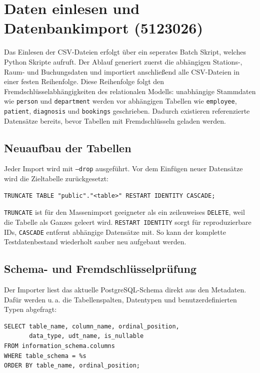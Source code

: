 \section{Daten einlesen und Datenbankimport (5123026)}

Das Einlesen der CSV-Dateien erfolgt über ein seperates Batch Skript, welches Python Skripte aufruft. Der Ablauf generiert zuerst die
abhängigen Stations-, Raum- und Buchungsdaten und importiert anschließend alle CSV-Dateien in einer
festen Reihenfolge. Diese Reihenfolge folgt den Fremdschlüsselabhängigkeiten des relationalen
Modells: unabhängige Stammdaten wie \texttt{person} und \texttt{department} werden vor abhängigen
Tabellen wie \texttt{employee}, \texttt{patient}, \texttt{diagnosis} und \texttt{bookings}
geschrieben. Dadurch existieren referenzierte Datensätze bereits, bevor Tabellen mit
Fremdschlüsseln geladen werden.

\subsection{Neuaufbau der Tabellen}

Jeder Import wird mit \texttt{--drop} ausgeführt. Vor dem Einfügen neuer Datensätze wird die
Zieltabelle zurückgesetzt:

\begin{lstlisting}[style=sqlstyle]
TRUNCATE TABLE "public"."<table>" RESTART IDENTITY CASCADE;
\end{lstlisting}

\texttt{TRUNCATE} ist für den Massenimport geeigneter als ein zeilenweises \texttt{DELETE}, weil
die Tabelle als Ganzes geleert wird. \texttt{RESTART IDENTITY} sorgt für reproduzierbare IDs,
\texttt{CASCADE} entfernt abhängige Datensätze mit. So kann der komplette Testdatenbestand
wiederholt sauber neu aufgebaut werden.

\subsection{Schema- und Fremdschlüsselprüfung}

Der Importer liest das aktuelle PostgreSQL-Schema direkt aus den Metadaten. Dafür werden u.\,a. die
Tabellenspalten, Datentypen und benutzerdefinierten Typen abgefragt:

\begin{lstlisting}[style=sqlstyle]
SELECT table_name, column_name, ordinal_position,
       data_type, udt_name, is_nullable
FROM information_schema.columns
WHERE table_schema = %s
ORDER BY table_name, ordinal_position;
\end{lstlisting}


